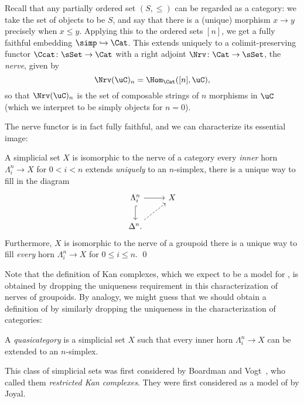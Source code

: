 \documentclass[a4paper,12pt]{article}
\begin{document}
\begin{defn}
  Recall that any partially ordered set $(S, \leq)$ can be regarded as
  a category: we take the set of objects to be $S$, and say that there
  is a (unique) morphism $x \to y$ precisely when $x \leq y$. Applying
  this to the ordered sets $[n]$, we get a fully faithful embedding
  $\simp \hookrightarrow \Cat$. This extends uniquely to a
  colimit-preserving functor $\Ccat \colon \sSet \to \Cat$ with a
  right adjoint $\Nrv \colon \Cat \to \sSet$, the \emph{nerve}, given
  by
  \[ \Nrv(\uC)_{n} = \Hom_{\Cat}([n], \uC),\] so that $\Nrv(\uC)_{n}$
  is the set of composable strings of $n$ morphisms in $\uC$ (which we
  interpret to be simply objects for $n = 0$).
\end{defn}
The nerve functor is in fact fully faithful, and we can characterize
its essential image:
\begin{propn}
  A simplicial set $X$ is isomorphic to the nerve of a category \IFF{}
  every \emph{inner} horn $\Lambda^{n}_{i} \to X$ for
  $0 < i < n$ extends \emph{uniquely} to an $n$-simplex, \ie{} there
  is a unique way to fill in the diagram
  \[
    \begin{tikzcd}
      \Lambda^{n}_{i} \arrow{r} \arrow[hookrightarrow]{d} & X  \\
      \Delta^{n}. \arrow[dashed]{ur}
    \end{tikzcd}
  \]
  Furthermore, $X$ is isomorphic to the nerve of a groupoid \IFF{}
  there is a unique way to fill \emph{every} horn
  $\Lambda^{n}_{i} \to X$ for $0 \leq i \leq n$. \qed
\end{propn}
Note that the definition of Kan complexes, which we expect to be a
model for \igpds{}, is obtained by dropping the uniqueness requirement
in this characterization of nerves of groupoids. By analogy, we might
guess that we should obtain a definition of \icats{} by similarly
dropping the uniqueness in the characterization of categories:
\begin{defn}
  A \emph{quasicategory} is a simplicial set $X$ such that every inner
  horn $\Lambda^{n}_{i} \to X$ can be extended to an $n$-simplex.
\end{defn}

\begin{remark}
  This class of simplicial sets was first considered by Boardman and
  Vogt~\cite{BoardmanVogt}, who called them \emph{restricted Kan
    complexes}. They were first considered as a model of \icats{} by
  Joyal.
\end{remark}
\end{document}

